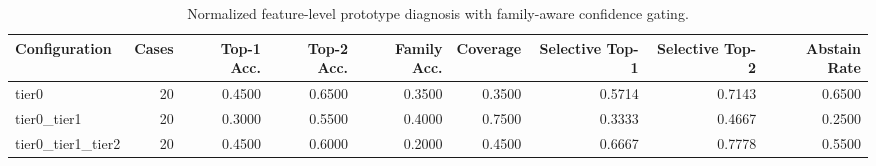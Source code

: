 \begin{table}[t]
\centering
\caption{Normalized feature-level prototype diagnosis with family-aware confidence gating.}
\label{tab:dice_stressor_hierarchical_diagnosis}
\footnotesize
\begin{tabular}{lrrrrrrrr}
\toprule
Configuration & Cases & Top-1 Acc. & Top-2 Acc. & Family Acc. & Coverage & Selective Top-1 & Selective Top-2 & Abstain Rate \\
\midrule
tier0 & 20 & 0.4500 & 0.6500 & 0.3500 & 0.3500 & 0.5714 & 0.7143 & 0.6500 \\
tier0_tier1 & 20 & 0.3000 & 0.5500 & 0.4000 & 0.7500 & 0.3333 & 0.4667 & 0.2500 \\
tier0_tier1_tier2 & 20 & 0.4500 & 0.6000 & 0.2000 & 0.4500 & 0.6667 & 0.7778 & 0.5500 \\
\bottomrule
\end{tabular}

\end{table}

